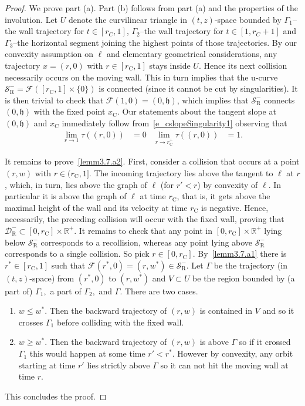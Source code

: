 \documentclass[AHL, Unicode, longabstracts,published]{cedram}
\newcommand{\ct}{r}
\newcommand{\fft}{\tau}
\newcommand{\crit}{\mathrm{C}}
\newcommand{\ctc}{\ct_\crit}
\newcommand{\xc}{x_\crit}
\newcommand{\reals}{\mathbb{R}}
\newcommand{\cF}{\mathcal{F}}
\newcommand{\cm}{\mathcal{F}}
\newcommand{\cell}{\mathcal{D}}
\newcommand{\slopeb}{\mathfrak{h}}
\newcommand{\recoPrivate}{\mathrm{R}}
\newcommand{\reco}{{\cell^-_{\recoPrivate}}}
\newcommand{\singPrivate}{\mathcal{S}}
\newcommand{\singReco}{\singPrivate_{\recoPrivate}}
\newcommand*{\relabel}{\renewcommand{\labelenumi}{(\theenumi)}}
\newcommand*{\romanenumi}{\renewcommand*{\theenumi}{\roman{enumi}}\relabel}
\begin{document}
\begin{proof}
We prove part (a). Part (b) follows from part (a) and the properties of the involution. Let $U$ denote the curvilinear triangle in $(t,z)$-space bounded by $\Gamma_1$--the wall trajectory for $t\in [r_C,1]$, $\Gamma_2$--the wall trajectory for $t\in [1, r_C+1]$ and $\Gamma_3$--the horizontal segment joining the highest points of those trajectories. By our convexity assumption on $\ell$ and elementary geometrical considerations, any trajectory $x = (r,0)$ with $r\in[\ctc,1]$ stays inside $U$. Hence its next collision necessarily occurs on the moving wall. This in turn implies that the u-curve $\singReco^- = \cm([\ctc,1]\times \{0\})$ is connected (since it cannot be cut by singularities). It is then trivial to check that $\cm(1,0)=(0,\slopeb)$, which implies that $\singReco^-$ connects $(0,\slopeb)$ with the fixed point $\xc$. Our statements about the tangent slope at $(0,\slopeb)$ and $\xc$ immediately follow from~\eqref{e_cslopeSingularity1} observing that
\begin{align*}
\lim_{\ct\to 1}\fft((\ct,0)) &= 0&
\lim_{\ct\to\ctc^+}\fft((\ct,0)) &= 1.
\end{align*}

It remains to prove~\eqref{lemm3.7.a2}. First, consider a collision that occurs at a point $(\ct,w)$ with $\ct \in (\ctc,1]$. The incoming trajectory lies above the tangent to $\ell$ at $\ct$, which, in turn, lies above the graph of $\ell$ (for $\ct' < \ct$) by convexity of $\ell$. In particular it is above the graph of $\ell$ at time $\ctc$, that is, it gets above the maximal height of the wall and its velocity at time $\ctc$ is negative. Hence, necessarily, the preceding collision will occur with the fixed wall, proving that $\reco\subset[0,\ctc]\times\reals^+$. It remains to check that any point in $[0,\ctc]\times\reals^+$ lying below $\singReco^-$ corresponds to a recollision, whereas any point lying above $\singReco^-$ corresponds to a single collision. So pick $r\in [0, \ctc]$. By~\eqref{lemm3.7.a1} there is $\ct^*\in [\ctc, 1]$ such that $\cF(\ct^*,0)=(r, w^*)\in \singReco^-$. Let $\Gamma$ be the trajectory (in $(t,z)$-space) from $(\ct^*,0)$ to $(r, w^*)$ and $V\subset U$ be the region bounded by (a part of) $\Gamma_1,$ a part of $\Gamma_2,$ and $\Gamma$. There are two cases.
\begin{enumerate}\romanenumi
\item $w\leq w^*$. Then the backward trajectory of $(r, w)$ is contained in $V$ and so it crosses $\Gamma_1$ before colliding with the fixed wall.
\item $w\geq w^*$. Then the backward trajectory of $(r, w)$ is above $\Gamma$ so if it crossed $\Gamma_1$ this would happen at some time $\ct'<\ct^*$. However by convexity, any orbit starting at time $\ct'$ lies strictly above $\Gamma$ so it can not hit the moving wall at time $r$.
\end{enumerate}
This concludes the proof.
\end{proof}
\end{document}

